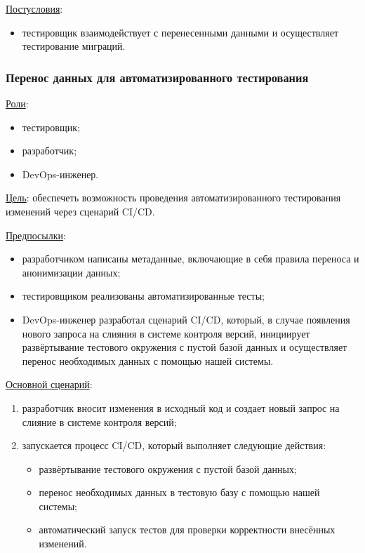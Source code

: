 \underline{Постусловия}:

\begin{itemize}
    \item тестировщик взаимодействует с перенесенными данными и осуществляет тестирование миграций.
\end{itemize}


\subsubsection{Перенос данных для автоматизированного тестирования}

\underline{Роли}:

\begin{itemize}
    \item тестировщик;
    \item разработчик;
    \item DevOps-инженер.
\end{itemize}

\underline{Цель}: обеспечеть возможность проведения автоматизированного тестирования изменений через сценарий CI/CD.

\underline{Предпосылки}:

\begin{itemize}
    \item разработчиком написаны метаданные, включающие в себя правила переноса и анонимизации данных;
    \item тестировщиком реализованы автоматизированные тесты;
    \item DevOps-инженер разработал сценарий CI/CD, который, в случае появления нового запроса на слияния в системе контроля версий, инициирует развёртывание тестового окружения с пустой базой данных и осуществляет перенос необходимых данных с помощью нашей системы.
\end{itemize}

\underline{Основной сценарий}:

\begin{enumerate}
    \item разработчик вносит изменения в исходный код и создает новый запрос на слияние в системе контроля версий;
    \item запускается процесс CI/CD, который выполняет следующие действия:
    \begin{itemize}
        \item развёртывание тестового окружения с пустой базой данных;
        \item перенос необходимых данных в тестовую базу с помощью нашей системы;
        \item автоматический запуск тестов для проверки корректности внесённых изменений.
    \end{itemize}
\end{enumerate}



